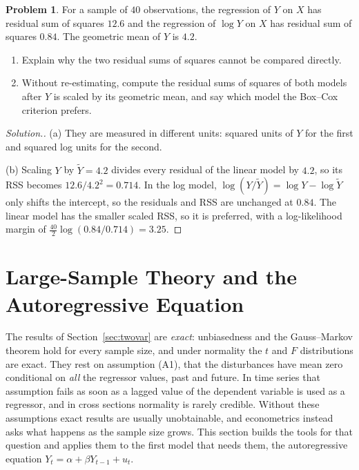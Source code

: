 \documentclass[11pt,a4paper]{article}
\numberwithin{equation}{section}
\theoremstyle{definition}
\newtheorem{problemx}{Problem}[subsection]
\newenvironment{problem}{\begin{problemx}}{\end{problemx}}
\newenvironment{solution}
  {\renewcommand{\qedsymbol}{}\begin{proof}[\textit{Solution}.]}
  {\end{proof}}
\begin{document}
\begin{problem}
For a sample of $40$ observations, the regression of $Y$ on $X$ has residual sum of squares $12.6$ and the regression of $\log Y$ on $X$ has residual
sum of squares $0.84$. The geometric mean of $Y$ is $4.2$.
\begin{enumerate}[label=(\alph*)]
\item Explain why the two residual sums of squares cannot be compared directly.
\item Without re-estimating, compute the residual sums of squares of both models after $Y$ is scaled by its geometric mean, and say which model
the Box--Cox criterion prefers.
\end{enumerate}
\end{problem}

\begin{solution}
(a) They are measured in different units: squared units of $Y$ for the first and squared log units for the second.

(b) Scaling $Y$ by $\tilde Y = 4.2$ divides every residual of the linear model by $4.2$, so its RSS becomes $12.6/4.2^2 = 0.714$. In the log model,
$\log(Y/\tilde Y) = \log Y - \log\tilde Y$ only shifts the intercept, so the residuals and RSS are unchanged at $0.84$. The linear model has the
smaller scaled RSS, so it is preferred, with a log-likelihood margin of $\frac{40}{2}\log(0.84/0.714) = 3.25$.
\end{solution}

\section{Large-Sample Theory and the Autoregressive Equation}
\label{sec:asym}

The results of Section~\ref{sec:twovar} are \emph{exact}: unbiasedness and the Gauss--Markov theorem hold for every sample size, and under
normality the $t$ and $F$ distributions are exact. They rest on assumption (A1), that the disturbances have mean zero conditional on \emph{all}
the regressor values, past and future. In time series that assumption fails as soon as a lagged value of the dependent variable is used as a
regressor, and in cross sections normality is rarely credible. Without these assumptions exact results are usually unobtainable, and
econometrics instead asks what happens as the sample size grows. This section builds the tools for that question and applies them to the
first model that needs them, the autoregressive equation $Y_t = \alpha + \beta Y_{t-1} + u_t$.
\end{document}
